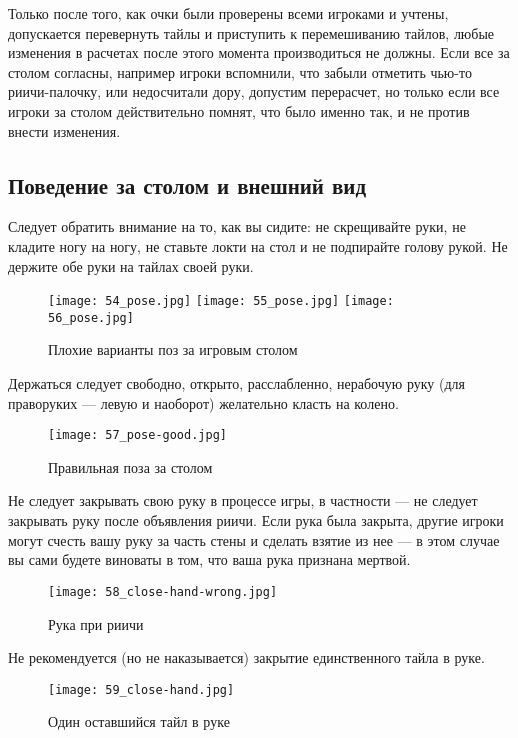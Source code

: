 Только после того, как очки были проверены всеми игроками и учтены, допускается перевернуть тайлы и приступить к перемешиванию тайлов, любые изменения в расчетах после этого момента производиться не должны. Если все за столом согласны, например игроки вспомнили, что забыли отметить чью-то риичи-палочку, или недосчитали дору, допустим перерасчет, но только если все игроки за столом действительно помнят, что было именно так, и не против внести изменения.

\newpage

\subsection{Поведение за столом и внешний вид}

Следует обратить внимание на то, как вы сидите: не скрещивайте руки, не кладите ногу на ногу, не ставьте локти на стол и не подпирайте голову рукой. Не держите обе руки на тайлах своей руки.

\begin{figure}[H]
	\centering
	\texttt{[image: 54\_pose.jpg]}
	\texttt{[image: 55\_pose.jpg]}
	\texttt{[image: 56\_pose.jpg]}
	\caption{Плохие варианты поз за игровым столом}
\end{figure}

\newpage

Держаться следует свободно, открыто, расслабленно, нерабочую руку (для праворуких — левую и наоборот) желательно класть на колено.

\begin{figure}[H]
	\centering
	\texttt{[image: 57\_pose-good.jpg]}
	\caption{Правильная поза за столом}
\end{figure}

Не следует закрывать свою руку в процессе игры, в частности --- не следует закрывать руку после объявления риичи. Если рука была закрыта, другие игроки могут счесть вашу руку за часть стены и сделать взятие из нее --- в этом случае вы сами будете виноваты в том, что ваша рука признана мертвой.

\begin{figure}[H]
	\centering
	\texttt{[image: 58\_close-hand-wrong.jpg]}
	\caption{Рука при риичи}
\end{figure}

\newpage

Не рекомендуется (но не наказывается) закрытие единственного тайла в руке.

\begin{figure}[H]
	\centering
	\texttt{[image: 59\_close-hand.jpg]}
	\caption{Один оставшийся тайл в руке}
\end{figure}

